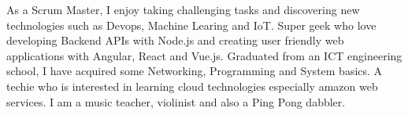 

\begin{cvparagraph}\justify

As a Scrum Master, I enjoy taking challenging tasks and discovering new technologies such as Devops, Machine Learing and IoT. Super geek who love developing Backend APIs with Node.js and creating user friendly web applications with Angular, React and Vue.js. Graduated from an ICT engineering school, I have acquired some Networking, Programming and System basics. A techie who is interested in learning cloud technologies especially amazon web services. I am a music teacher, violinist and also a Ping Pong dabbler.
\end{cvparagraph}
